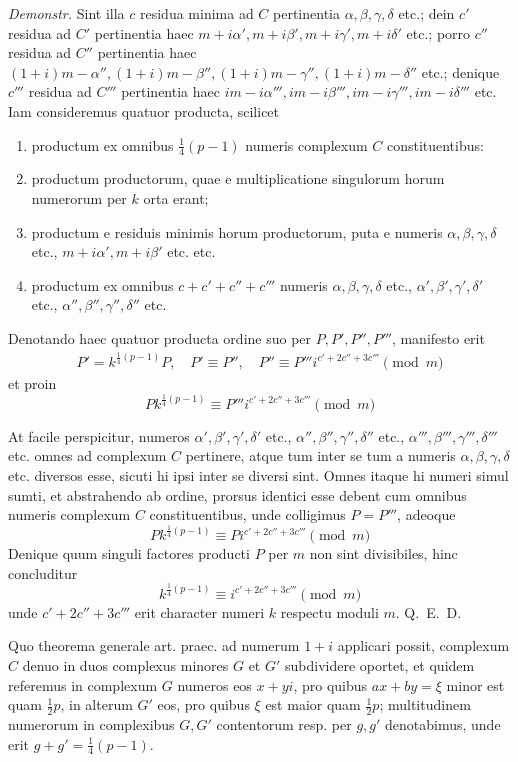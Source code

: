 \emph{Demonstr.} Sint illa $c$ residua minima ad $C$ pertinentia $\alpha,\beta,\gamma,\delta$ etc.; dein $c'$ residua ad $C'$ pertinentia haec $m+i\alpha',m+i\beta',m+i\gamma',m+i\delta'$ etc.; porro $c''$ residua ad $C''$ pertinentia haec $(1+i)m-\alpha'',(1+i)m-\beta'',(1+i)m-\gamma'',(1+i)m-\delta''$ etc.; denique $c'''$ residua ad $C'''$ pertinentia haec $im-i\alpha''',im-i\beta''',im-i\gamma''',im-i\delta'''$ etc. Iam consideremus quatuor producta, scilicet
\begin{enumerate}
\renewcommand{\labelenumi}{\arabic{enumi})}
\item productum ex omnibus $\frac14(p-1)$ numeris complexum $C$ constituentibus:
\item productum productorum, quae e multiplicatione singulorum horum numerorum per $k$ orta erant;
\item productum e residuis minimis horum productorum, puta e numeris $\alpha,\beta,\gamma,\delta$ etc., $m+i\alpha',m+i\beta'$ etc. etc.
\item productum ex omnibus $c+c'+c''+c'''$ numeris $\alpha,\beta,\gamma,\delta$ etc., $\alpha',\beta',\gamma',\delta'$ etc., $\alpha'',\beta'',\gamma'',\delta''$ etc.
\end{enumerate}
Denotando haec quatuor producta ordine suo per $P,P',P'',P'''$, manifesto erit
\[
\begin{gathered}
P'=k^{\frac14(p-1)}P,\quad P'\equiv P'',\quad
P''\equiv P'''i^{c'+2c''+3c'''}\pmod m
\end{gathered}
\]
et proin
\[
Pk^{\frac14(p-1)}\equiv P'''i^{c'+2c''+3c'''}\pmod m
\]

At facile perspicitur, numeros $\alpha',\allowbreak\beta',\allowbreak\gamma',\allowbreak\delta'$ etc., $\alpha'',\allowbreak\beta'',\allowbreak\gamma'',\allowbreak\delta''$ etc., $\alpha''',\allowbreak\beta''',\allowbreak\gamma''',\allowbreak\delta'''$ etc. omnes ad complexum $C$ pertinere, atque tum inter se tum a numeris $\alpha,\allowbreak\beta,\allowbreak\gamma,\allowbreak\delta$ etc. diversos esse, sicuti hi ipsi inter se diversi sint. Omnes itaque hi numeri simul sumti, et abstrahendo ab ordine, prorsus identici esse debent cum omnibus numeris complexum $C$ constituentibus, unde colligimus $P=P'''$, adeoque
\[
Pk^{\frac14(p-1)}\equiv Pi^{c'+2c''+3c'''}\pmod m
\]
Denique quum singuli factores producti $P$ per $m$ non sint divisibiles, hinc concluditur
\[
k^{\frac14(p-1)}\equiv i^{c'+2c''+3c'''}\pmod m
\]
unde $c'+2c''+3c'''$ erit character numeri $k$ respectu moduli $m$. Q.~E.~D.

%
Quo theorema generale art. praec. ad numerum $1+i$ applicari possit, complexum $C$ denuo in duos complexus minores $G$ et $G'$ subdividere oportet, et quidem referemus in complexum $G$ numeros eos $x+yi$, pro quibus $ax+by=\xi$ minor est quam $\frac12p$, in alterum $G'$ eos, pro quibus $\xi$ est maior quam $\frac12p$; multitudinem numerorum in complexibus $G,G'$ contentorum resp. per $g,g'$ denotabimus, unde erit $g+g'=\frac14(p-1)$.

